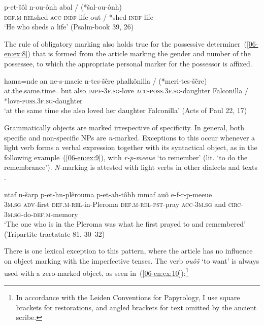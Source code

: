 \documentclass[output=paper]{LSP/langsci}
\begin{document}
\begin{exe}
\ex \label{06-en:ex:7}
\gll p-et-šôl n-ou-ônh abal / (*šal-ou-ônh)\\
	\textsc{def.m-}\textsc{rel}shed \textsc{acc-indf-}life out / *shed\textsc{-indf-}life\\
\glt ‘He who sheds a life’ (Psalm-book 39, 26)
\end{exe}

The rule of obligatory marking also holds true for the possessive determiner~(\ref{06-en:ex:8}) that is formed from the  article marking the gender and number of the possessee, to which the appropriate personal marker for the possessor is affixed.

\begin{exe}
\ex \label{06-en:ex:8}
\gll hama=nde an ne-s-maeie n-tes-šêre 	phalkônilla / (*meri-tes-šêre)\\
	at.the.same.time=but also \textsc{impf-3f.sg-}love \textsc{acc-poss.3f.sg-}daughter Falconilla / *love-\textsc{poss.3f.sg-}daughter\\
\glt ‘at the same time she also loved her daughter Falconilla’ (Acts of Paul 22, 17)
\end{exe}

Grammatically  objects are marked irrespective of specificity. In general, both specific and non-specific NPs are \textit{n-}marked. Exceptions to this occur whenever a light verb forms a verbal expression together with its syntactical object, as in the following example~(\ref{06-en:ex:9}), with \textit{r-p-meeue} ‘to remember’ (lit. ‘to do the remembrance’). \textit{N-}marking is attested with light verbs in other dialects and texts \citep[133]{Layton2000Coptic}. 

\begin{exe}
\ex \label{06-en:ex:9}
\gll ntaf 	n-šarp 		p-et-hn-plêrouma 		p-et-ah-tôbh 	mmaf	auô 	e-f-r-p-meeue\\
\textsc{3m.sg} \textsc{adv-}first \textsc{def.m-}\textsc{rel-}in-Pleroma \textsc{def.m-rel-pst-}pray \textsc{acc-3m.sg} and \textsc{circ-3m.sg-}do-\textsc{def.m-}memory\\
\glt ‘The one who is in the Pleroma was what he first prayed to and remembered’ (Tripartite tractatate 81, 30–32)
\end{exe}

There is one lexical exception to this pattern, where the  article has no influence on object marking with the imperfective tenses. The verb \textit{ouôš} ‘to want’ is always used with a zero-marked  object, as seen in~(\ref{06-en:ex:10}):\footnote{In accordance with the Leiden Conventions for Papyrology, I use square brackets for restorations, and angled brackets for text omitted by the ancient scribe.} 
\end{document}
